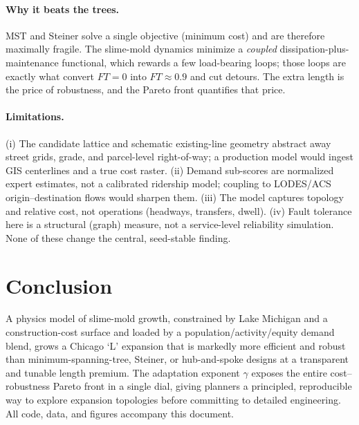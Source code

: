 \documentclass[11pt]{article}
\begin{document}
\paragraph{Why it beats the trees.} MST and Steiner solve a single objective (minimum cost)
and are therefore maximally fragile. The slime-mold dynamics minimize a \emph{coupled}
dissipation-plus-maintenance functional, which rewards a few load-bearing loops; those loops
are exactly what convert $FT=0$ into $FT\approx 0.9$ and cut detours. The extra length is the
price of robustness, and the Pareto front quantifies that price.

\paragraph{Limitations.} (i) The candidate lattice and schematic existing-line geometry
abstract away street grids, grade, and parcel-level right-of-way; a production model would
ingest GIS centerlines and a true cost raster. (ii) Demand sub-scores are normalized expert
estimates, not a calibrated ridership model; coupling to LODES/ACS origin--destination flows
would sharpen them. (iii) The model captures topology and relative cost, not operations
(headways, transfers, dwell). (iv) Fault tolerance here is a structural (graph) measure, not a
service-level reliability simulation. None of these change the central, seed-stable finding.

\section{Conclusion}
A physics model of slime-mold growth, constrained by Lake Michigan and a construction-cost
surface and loaded by a population/activity/equity demand blend, grows a Chicago `L' expansion
that is markedly more efficient and robust than minimum-spanning-tree, Steiner, or hub-and-spoke
designs at a transparent and tunable length premium. The adaptation exponent $\gamma$ exposes the
entire cost--robustness Pareto front in a single dial, giving planners a principled, reproducible
way to explore expansion topologies before committing to detailed engineering. All code, data,
and figures accompany this document.
\end{document}
